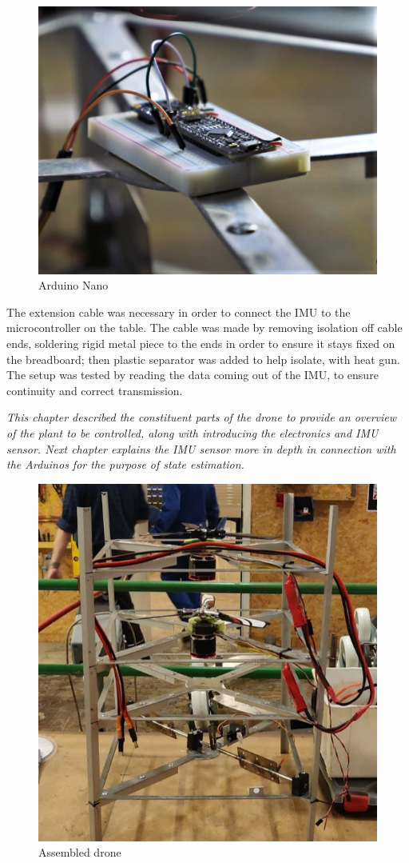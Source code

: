 \begin{figure}[h]
  \centering
  \includegraphics[scale=0.3]{graphics/Drone/ArduinoNano2.png}
  \caption{Arduino Nano}
  \label{fig:Arduino Nano}
\end{figure}


The extension cable was necessary in order to connect the IMU to the microcontroller on the table. 
The cable was made by removing isolation off cable ends, soldering rigid metal piece to the ends in order to ensure it stays fixed on the breadboard; then plastic separator was added to help isolate, with heat gun.
The setup was tested by reading the data coming out of the IMU, to ensure continuity and correct transmission. 

\textit{This chapter described the constituent parts of the drone to provide an overview of the plant to be controlled, along with introducing the electronics and IMU sensor. Next chapter explains the IMU sensor more in depth in connection with the Arduinos for the purpose of state estimation. }


\begin{figure}[h]
  \centering
  \includegraphics[scale=0.7]{graphics/Drone/droneBuilt.png}
  \caption{Assembled drone}
  \label{fig:Assembled drone}
\end{figure}